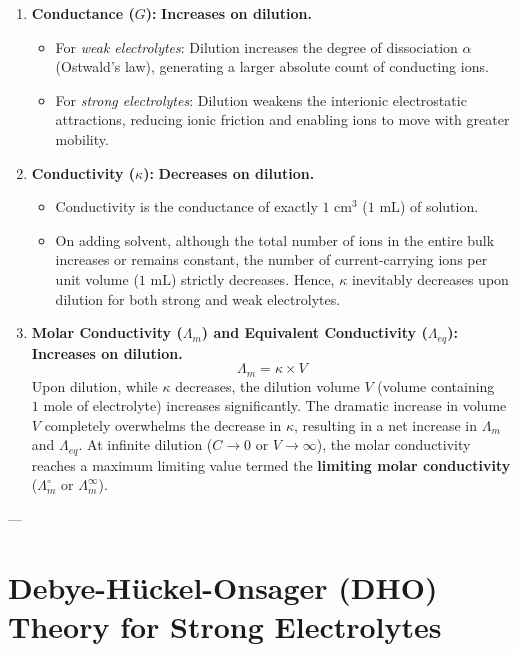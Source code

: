 \begin{enumerate}[leftmargin=*]
    \item \textbf{Conductance ($G$):} \textbf{Increases on dilution.}
    \begin{itemize}
        \item For \emph{weak electrolytes}: Dilution increases the degree of dissociation $\alpha$ (Ostwald's law), generating a larger absolute count of conducting ions.
        \item For \emph{strong electrolytes}: Dilution weakens the interionic electrostatic attractions, reducing ionic friction and enabling ions to move with greater mobility.
    \end{itemize}

    \item \textbf{Conductivity ($\kappa$):} \textbf{Decreases on dilution.}
    \begin{itemize}
        \item Conductivity is the conductance of exactly $1\text{ cm}^3$ ($1\text{ mL}$) of solution.
        \item On adding solvent, although the total number of ions in the entire bulk increases or remains constant, the number of current-carrying ions per unit volume ($1\text{ mL}$) strictly decreases. Hence, $\kappa$ inevitably decreases upon dilution for both strong and weak electrolytes.
    \end{itemize}

    \item \textbf{Molar Conductivity ($\Lambda_m$) and Equivalent Conductivity ($\Lambda_{eq}$):} \textbf{Increases on dilution.}
    \begin{equation}
        \Lambda_m = \kappa \times V
    \end{equation}
    Upon dilution, while $\kappa$ decreases, the dilution volume $V$ (volume containing $1\text{ mole}$ of electrolyte) increases significantly. The dramatic increase in volume $V$ completely overwhelms the decrease in $\kappa$, resulting in a net increase in $\Lambda_m$ and $\Lambda_{eq}$.
    At infinite dilution ($C \to 0$ or $V \to \infty$), the molar conductivity reaches a maximum limiting value termed the \textbf{limiting molar conductivity} ($\Lambda_m^\circ$ or $\Lambda_m^\infty$).
\end{enumerate}

---

\section{Debye-Hückel-Onsager (DHO) Theory for Strong Electrolytes}

